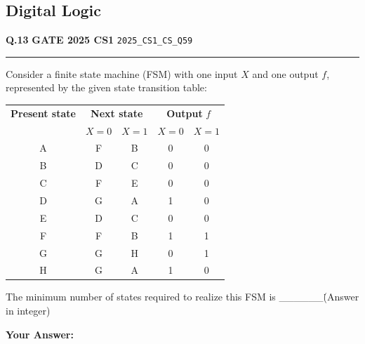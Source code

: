 \documentclass[a4paper,10pt]{article}
\begin{document}
\subsection*{Digital Logic}
\vspace{-4pt}
\noindent
\begin{tcolorbox}[
    blanker,
    sidebyside,
    sidebyside align=top,
    lefthand width=0.55\textwidth,
    top=4pt, bottom=4pt, left=0pt, right=0pt,
    middle=16pt,
    underlay={
        \draw[dashed, black!80, line width=0.8pt, dash pattern=on 4pt off 3pt]
            ([xshift=0.55\textwidth+8pt]frame.north west) --
            ([xshift=0.55\textwidth+8pt]frame.south west);
    }
]
\textbf{Q.13}  \hfill {\footnotesize\textbf{GATE 2025 CS1} \quad \tiny\texttt{2025\_CS1\_CS\_Q59}}
\vspace{2pt}\hrule height 0.3pt\vspace{4pt}

Consider a finite state machine (FSM) with one input $X$ and one output $f$, represented by the given state transition table:
\par\medskip
\begin{tabular}{|c|cc|cc|}
\hline
\textbf{Present state} & \multicolumn{2}{c|}{\textbf{Next state}} & \multicolumn{2}{c|}{\textbf{Output } $f$} \\
& $X=0$ & $X=1$ & $X=0$ & $X=1$ \\
\hline
A & F & B & 0 & 0 \\
B & D & C & 0 & 0 \\
C & F & E & 0 & 0 \\
D & G & A & 1 & 0 \\
E & D & C & 0 & 0 \\
F & F & B & 1 & 1 \\
G & G & H & 0 & 1 \\
H & G & A & 1 & 0 \\
\hline
\end{tabular}
\par\medskip
The minimum number of states required to realize this FSM is \_\_\_\_\_\_\. (Answer in integer)

\par\vspace{6pt}\noindent\textbf{Your Answer:} \fbox{\rule{0pt}{1.3ex}\hspace{3cm}}

\tcblower


\end{tcolorbox}
\end{document}
